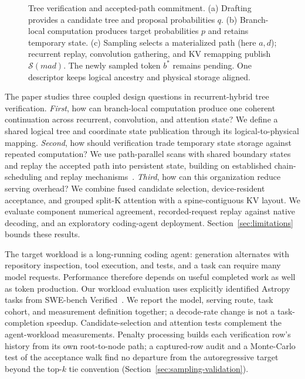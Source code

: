 \documentclass[conference]{IEEEtran}
\begin{document}
\begin{figure}[t]
\centering
\resizebox{\textwidth}{!}{}
\caption{Tree verification and accepted-path commitment. (a) Drafting provides a candidate tree and proposal probabilities $q$. (b) Branch-local computation produces target probabilities $p$ and retains temporary state. (c) Sampling selects a materialized path (here $a,d$); recurrent replay, convolution gathering, and KV remapping publish $\mathcal{S}(mad)$. The newly sampled token $b^*$ remains pending. One descriptor keeps logical ancestry and physical storage aligned.}
\label{fig:pipeline}
\end{figure}

The paper studies three coupled design questions in recurrent-hybrid tree verification. \textit{First}, how can branch-local computation produce one coherent continuation across recurrent, convolution, and attention state? We define a shared logical tree and coordinate state publication through its logical-to-physical mapping. \textit{Second}, how should verification trade temporary state storage against repeated computation? We use path-parallel scans with shared boundary states and replay the accepted path into persistent state, building on established chain-scheduling and replay mechanisms~\cite{wang2026specla,oda2026marginals}. \textit{Third}, how can this organization reduce serving overhead? We combine fused candidate selection, device-resident acceptance, and grouped split-K attention with a spine-contiguous KV layout. We evaluate component numerical agreement, recorded-request replay against native decoding, and an exploratory coding-agent deployment. Section~\ref{sec:limitations} bounds these results.

The target workload is a long-running coding agent: generation alternates with repository inspection, tool execution, and tests, and a task can require many model requests. Performance therefore depends on useful completed work as well as token production. Our workload evaluation uses explicitly identified Astropy tasks from SWE-bench Verified~\cite{jimenez2024swe}. We report the model, serving route, task cohort, and measurement definition together; a decode-rate change is not a task-completion speedup. Candidate-selection and attention tests complement the agent-workload measurements. Penalty processing builds each verification row's history from its own root-to-node path; a captured-row audit and a Monte-Carlo test of the acceptance walk find no departure from the autoregressive target beyond the top-$k$ tie convention (Section~\ref{sec:sampling-validation}).
\end{document}
